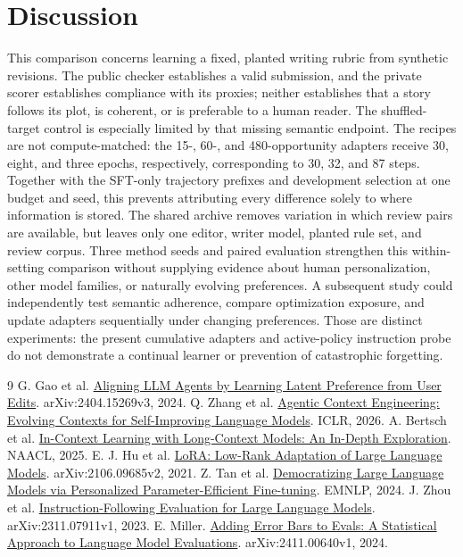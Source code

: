 \documentclass[10pt,twocolumn,letterpaper]{article}
\newcommand{\claim}[2]{#2}
\begin{document}
\section{Discussion}
\claim{C80}{This comparison concerns learning a fixed, planted writing rubric from synthetic revisions. The public checker establishes a valid submission, and the private scorer establishes compliance with its proxies; neither establishes that a story follows its plot, is coherent, or is preferable to a human reader. The shuffled-target control is especially limited by that missing semantic endpoint.}
\claim{C81}{The recipes are not compute-matched: the 15-, 60-, and 480-opportunity adapters receive 30, eight, and three epochs, respectively, corresponding to 30, 32, and 87 steps. Together with the SFT-only trajectory prefixes and development selection at one budget and seed, this prevents attributing every difference solely to where information is stored.}
\claim{C82}{The shared archive removes variation in which review pairs are available, but leaves only one editor, writer model, planted rule set, and review corpus. Three method seeds and paired evaluation strengthen this within-setting comparison without supplying evidence about human personalization, other model families, or naturally evolving preferences.}
\claim{C83}{A subsequent study could independently test semantic adherence, compare optimization exposure, and update adapters sequentially under changing preferences. Those are distinct experiments: the present cumulative adapters and active-policy instruction probe do not demonstrate a continual learner or prevention of catastrophic forgetting.}
{\small
\begin{thebibliography}{9}
 \claim{R01}{G. Gao et al. \href{https://arxiv.org/abs/2404.15269v3}{Aligning LLM Agents by Learning Latent Preference from User Edits}. arXiv:2404.15269v3, 2024.}
 \claim{R02}{Q. Zhang et al. \href{https://arxiv.org/abs/2510.04618v3}{Agentic Context Engineering: Evolving Contexts for Self-Improving Language Models}. ICLR, 2026.}
 \claim{R03}{A. Bertsch et al. \href{https://arxiv.org/abs/2405.00200v2}{In-Context Learning with Long-Context Models: An In-Depth Exploration}. NAACL, 2025.}
 \claim{R04}{E. J. Hu et al. \href{https://arxiv.org/abs/2106.09685v2}{LoRA: Low-Rank Adaptation of Large Language Models}. arXiv:2106.09685v2, 2021.}
 \claim{R05}{Z. Tan et al. \href{https://arxiv.org/abs/2402.04401v3}{Democratizing Large Language Models via Personalized Parameter-Efficient Fine-tuning}. EMNLP, 2024.}
 \claim{R06}{J. Zhou et al. \href{https://arxiv.org/abs/2311.07911v1}{Instruction-Following Evaluation for Large Language Models}. arXiv:2311.07911v1, 2023.}
 \claim{R07}{E. Miller. \href{https://arxiv.org/abs/2411.00640v1}{Adding Error Bars to Evals: A Statistical Approach to Language Model Evaluations}. arXiv:2411.00640v1, 2024.}
\end{thebibliography}
}
\end{document}
